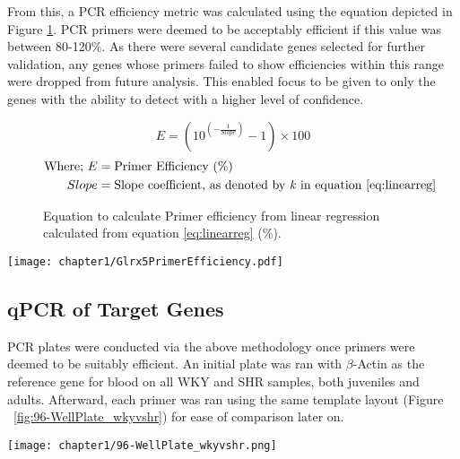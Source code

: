 \noindent From this, a PCR efficiency metric was calculated using the equation depicted in Figure \ref{eq:primereff}. PCR primers were deemed to be acceptably efficient if this value was between 80-120\%. As there were several candidate genes selected for further validation, any genes whose primers failed to show efficiencies within this range were dropped from future analysis. This enabled focus to be given to only the genes with the ability to detect with a higher level of confidence. 

\begin{figure}[!hbtp]
\LARGE
\[ E=(10^{(-\frac{1}{Slope})}-1)\times 100\]
\normalsize
\begin{align*}
\text{Where;} ~E &= \text{Primer Efficiency (\%)} \\
~Slope &= \text{Slope coefficient, as denoted by \textit{k} in equation \ref{eq:linearreg}}
\end{align*}
\caption[Equation to calculate Primer Efficiency]{Equation to calculate Primer efficiency from linear regression calculated from equation \ref{eq:linearreg} (\%).}
\label{eq:primereff}
\end{figure}

\begin{figure*}[!hbtp]
\centering
\texttt{[image: chapter1/Glrx5PrimerEfficiency.pdf]}
\caption[Example Standard Curve]{Example Standard Curve for assessing primer efficiency (Glrx5). Detection values are plotted against the natural log transformed range of cDNA template dilutions. From the resulting regression analysis, the calculation of the slope was input into the formula outlined below.}
\label{fig:primereff}
\end{figure*}

\subsection{qPCR of Target Genes} \label{qPCR of Target Genes}
PCR plates were conducted via the above methodology once primers were deemed to be suitably efficient. An initial plate was ran with $\beta$-Actin as the reference gene for blood on all WKY and SHR samples, both juveniles and adults. Afterward, each primer was ran using the same template layout (Figure ~\ref{fig:96-WellPlate_wkyvshr}) for ease of comparison later on.  \\

\begin{figure*}[!hbtp]
\centering
\texttt{[image: chapter1/96-WellPlate\_wkyvshr.png]}
\caption[qPCR plate layout for WKY vs SHR Comparison]{qPCR Layout for WKY vs SHR comparisons at both Juvenile and Adult ages}
\label{fig:96-WellPlate_wkyvshr}
\end{figure*}

